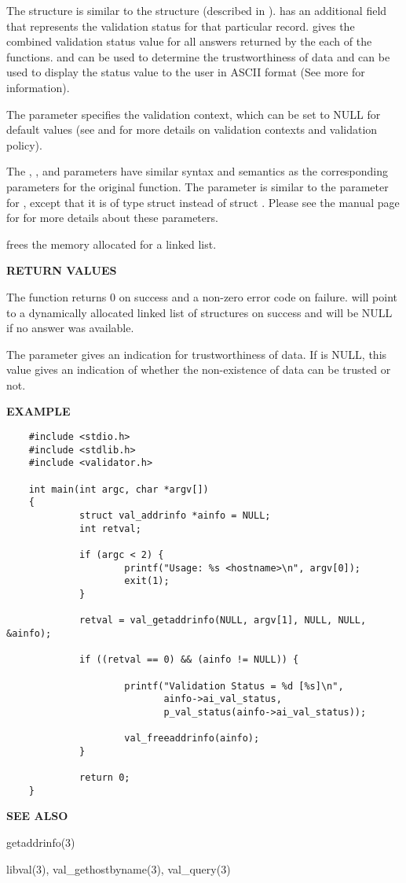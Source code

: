 The  structure is similar to the 
structure (described in ).   has an
additional field  that represents the validation status
for that particular record.   gives the combined validation
status value for all answers returned by the each of the functions.
 and  can be used to determine
the trustworthiness of data and  can be used to display
the status value to the user in ASCII format (See  more for
information).

The  parameter specifies the validation context, which can be set to
NULL for default values (see  and  for more
details on validation contexts and validation policy).

The , , and  parameters have similar
syntax and semantics as the corresponding parameters for the original
 function.  The  parameter is similar to the
 parameter for , except that it is of type struct
 instead of struct .  Please see the
manual page for  for more details about these parameters.

 frees the memory allocated for a
 linked list.

{\bf RETURN VALUES}

The  function returns 0 on success and a non-zero
error code on failure.   will point to a dynamically allocated
linked list of  structures on success and will be NULL
if no answer was available.

The  parameter gives an indication for trustworthiness of
data. If  is NULL, this value gives an indication of whether the
non-existence of data can be trusted or not.

{\bf EXAMPLE}

\begin{verbatim}
    #include <stdio.h>
    #include <stdlib.h>
    #include <validator.h>

    int main(int argc, char *argv[])
    {
             struct val_addrinfo *ainfo = NULL;
             int retval;

             if (argc < 2) {
                     printf("Usage: %s <hostname>\n", argv[0]);
                     exit(1);
             }

             retval = val_getaddrinfo(NULL, argv[1], NULL, NULL, &ainfo);

             if ((retval == 0) && (ainfo != NULL)) {

                     printf("Validation Status = %d [%s]\n",
                            ainfo->ai_val_status,
                            p_val_status(ainfo->ai_val_status));

                     val_freeaddrinfo(ainfo);
             }

             return 0;
    }
\end{verbatim}

{\bf SEE ALSO}

getaddrinfo(3) 

libval(3), val\_gethostbyname(3), val\_query(3)

